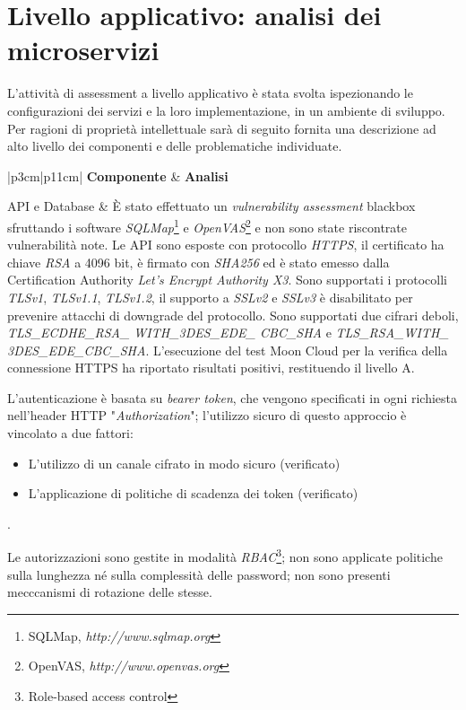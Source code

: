 \documentclass[../main.tex]{subfiles}
\begin{document}
\section{Livello applicativo: analisi dei microservizi}

L'attività di assessment a livello applicativo è stata svolta ispezionando le configurazioni dei servizi e la loro implementazione, in un ambiente di sviluppo.
Per ragioni di proprietà intellettuale sarà di seguito fornita una descrizione ad alto livello dei componenti e delle problematiche individuate.

\begin{ltabulary}{|p{3cm}|p{11cm}|}
\hline
\textbf{Componente} & \textbf{Analisi} \\
\hline
\endhead

API e Database & È stato effettuato un \textit{vulnerability assessment} blackbox sfruttando i software \textit{SQLMap}\footnote{SQLMap, \textit{http://www.sqlmap.org}} e \textit{OpenVAS}\footnote{OpenVAS, \textit{http://www.openvas.org}} e non sono state riscontrate vulnerabilità note.
Le API sono esposte con protocollo \textit{HTTPS}, il certificato ha chiave \textit{RSA} a 4096 bit, è firmato con \textit{SHA256} ed è stato emesso dalla Certification Authority \textit{Let's Encrypt Authority X3}. Sono supportati i protocolli \textit{TLSv1}, \textit{TLSv1.1}, \textit{TLSv1.2}, il supporto a \textit{SSLv2} e \textit{SSLv3} è disabilitato per prevenire attacchi di downgrade del protocollo. Sono supportati due cifrari deboli, \textit{TLS\_ECDHE\_RSA\_ WITH\_3DES\_EDE\_ CBC\_SHA} e \textit{TLS\_RSA\_WITH\_ 3DES\_EDE\_CBC\_SHA}. L'esecuzione del test Moon Cloud per la verifica della connessione HTTPS ha riportato risultati positivi, restituendo il livello A.

L'autenticazione è basata su \textit{bearer token}, che vengono specificati in ogni richiesta nell'header HTTP "\textit{Authorization}"; l'utilizzo sicuro di questo approccio è vincolato a due fattori:
\begin{itemize}
    \item L'utilizzo di un canale cifrato in modo sicuro (verificato)
    \item L'applicazione di politiche di scadenza dei token (verificato)
\end{itemize}.

Le autorizzazioni sono gestite in modalità \textit{RBAC}\footnote{Role-based access control}; non sono applicate politiche sulla lunghezza né sulla complessità delle password; non sono presenti mecccanismi di rotazione delle stesse.


\end{ltabulary}
\end{document}
